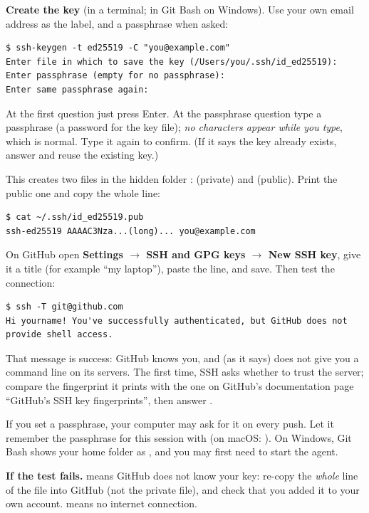 \textbf{Create the key} (in a terminal; in Git Bash on Windows). Use your own email address as the label, and a passphrase when asked:

\begin{lstlisting}
$ ssh-keygen -t ed25519 -C "you@example.com"
Enter file in which to save the key (/Users/you/.ssh/id_ed25519):
Enter passphrase (empty for no passphrase):
Enter same passphrase again:
\end{lstlisting}

At the first question just press Enter. At the passphrase question type a passphrase (a password for the key file); \emph{no characters appear while you type}, which is normal. Type it again to confirm. (If it says the key already exists, answer  and reuse the existing key.)

This creates two files in the hidden folder :  (private) and  (public). Print the public one and copy the whole line:

\begin{lstlisting}
$ cat ~/.ssh/id_ed25519.pub
ssh-ed25519 AAAAC3Nza...(long)... you@example.com
\end{lstlisting}

On GitHub open \textbf{Settings $\rightarrow$ SSH and GPG keys $\rightarrow$ New SSH key}, give it a title (for example ``my laptop''), paste the line, and save. Then test the connection:

\begin{lstlisting}
$ ssh -T git@github.com
Hi yourname! You've successfully authenticated, but GitHub does not provide shell access.
\end{lstlisting}

That message is success: GitHub knows you, and (as it says) does not give you a command line on its servers. The first time, SSH asks whether to trust the server; compare the fingerprint it prints with the one on GitHub's documentation page ``GitHub's SSH key fingerprints'', then answer .

If you set a passphrase, your computer may ask for it on every push. Let it remember the passphrase for this session with  (on macOS: ). On Windows, Git Bash shows your home folder as , and you may first need  to start the agent.

\begin{pitfall}
\textbf{If the test fails.}  means GitHub does not know your key: re-copy the \emph{whole} line of the  file into GitHub (not the private file), and check that you added it to your own account.  means no internet connection.
\end{pitfall}

